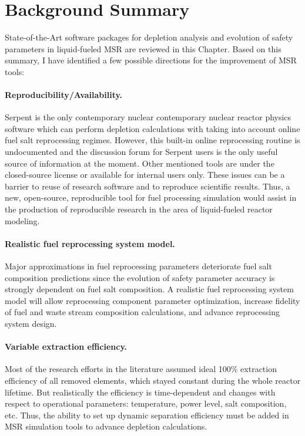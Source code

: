 \section{Background Summary}
State-of-the-Art software packages for depletion analysis and evolution of 
safety parameters in liquid-fueled \gls{MSR} are reviewed in this Chapter. 
Based on this summary, I have identified a few possible directions for 
the improvement of \gls{MSR} tools:
\paragraph{Reproducibility/Availability.}
Serpent is the only contemporary nuclear 
contemporary nuclear 
reactor physics software which can perform depletion calculations with taking 
into account online fuel salt reprocessing regimes. However, this built-in 
online reprocessing routine is undocumented  and the discussion forum for 
Serpent users is the only useful source of information at the moment. 
Other mentioned tools are under the closed-source license or available for 
internal users only. These issues can be a barrier to reuse of research 
software and to reproduce scientific results. Thus, a new, open-source, 
reproducible tool for fuel processing simulation would assist in the 
production of reproducible research in the area of liquid-fueled reactor 
modeling.
\paragraph{Realistic fuel reprocessing system model.} 
Major approximations in fuel reprocessing parameters deteriorate fuel salt 
composition predictions since the evolution of safety parameter accuracy is 
strongly dependent on fuel salt composition. A realistic fuel reprocessing 
system model will allow reprocessing component parameter optimization,  
increase fidelity of fuel and waste stream composition calculations, and 
advance reprocessing system design.
\paragraph{Variable extraction efficiency.} Most of the research efforts in 
the literature assumed ideal 100\% extraction efficiency of all removed 
elements, which stayed 
constant during the whole reactor lifetime. But realistically the efficiency 
is time-dependent and changes with respect to operational parameters: 
temperature, power level, salt composition, etc. Thus, the ability to set up 
dynamic separation efficiency must be added in \gls{MSR} simulation tools to 
advance depletion calculations.
